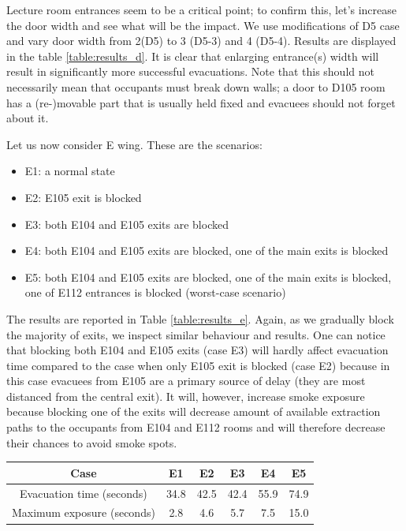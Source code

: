 Lecture room entrances seem to be a critical point; to confirm this, let's
increase the door width and see what will be the impact.
We use modifications of D5 case and vary door width from 2(D5) to 3 (D5-3)
and 4 (D5-4).
Results are displayed in the table \ref{table:results_d}.
It is clear that enlarging entrance(s) width will result in significantly more
successful evacuations.
Note that this should not necessarily mean that occupants must break down walls;
a door to D105 room has a (re-)movable part that is usually held fixed and
evacuees should not forget about it.

Let us now consider E wing. These are the scenarios:
\begin{itemize}
    \item E1: a normal state
    \item E2: E105 exit is blocked
    \item E3: both E104 and E105 exits are blocked
    \item E4: both E104 and E105 exits are blocked, one of the main exits is
    blocked
    \item E5: both E104 and E105 exits are blocked, one of the main exits is
    blocked, one of E112 entrances is blocked (worst-case scenario)
\end{itemize}

The results are reported in Table \ref{table:results_e}.
Again, as we gradually block the majority of exits, we inspect similar behaviour
and results.
One can notice that blocking both E104 and E105 exits (case E3) will hardly
affect evacuation time compared to the case when only E105 exit is blocked
(case E2) because in this case evacuees from E105 are a primary source of
delay (they are most distanced from the central exit).
It will, however, increase smoke exposure because blocking one of the exits
will decrease amount of available extraction paths to the occupants
from E104 and E112 rooms and will therefore decrease their chances to avoid
smoke spots.

\begin{center}
    \label{table:results_e}
    \begin{tabular}{ c | c | c | c | c | c }
        \hline
        Case & E1 & E2 & E3 & E4 & E5 \\
        \hline
        Evacuation time (seconds) & 34.8 & 42.5 & 42.4 & 55.9 & 74.9 \\
        Maximum exposure (seconds) & 2.8 & 4.6 & 5.7 & 7.5 & 15.0 \\
        \hline
    \end{tabular}
\end{center}


